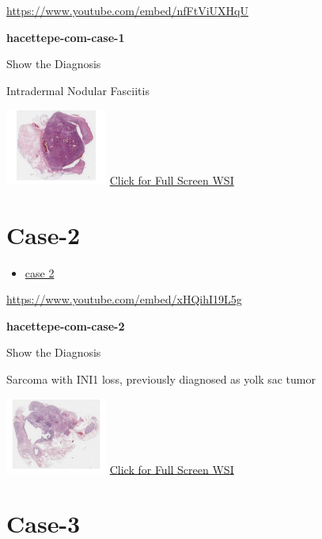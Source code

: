 \documentclass[
  letterpaper,
  paper=6in:9in,
  pagesize=pdftex,
  headinclude=on,
  footinclude=on,
  12pt]{scrbook}
\providecommand{\tightlist}{%
  \setlength{\itemsep}{0pt}\setlength{\parskip}{0pt}}\usepackage{longtable,booktabs,array}
\begin{document}
\url{https://www.youtube.com/embed/nfFtViUXHqU}

\textbf{hacettepe-com-case-1}

Show the Diagnosis

\hypertarget{answer}{}
Intradermal Nodular Fasciitis

\href{https://images.patolojiatlasi.com/hacettepe-com-case-1/HE.html}{\includegraphics[width=0.25\textwidth,height=\textheight]{./screenshots/hacettepe-com-case-1_screenshot.png}}
\href{https://images.patolojiatlasi.com/hacettepe-com-case-1/HE.html}{Click
for Full Screen WSI}

\hypertarget{sec-hacettepe-case-of-the-month-case-2}{%
\section{Case-2}\label{sec-hacettepe-case-of-the-month-case-2}}

\begin{itemize}
\tightlist
\item
  \href{https://www.youtube.com/watch?v=xHQihI19L5g\&ab_channel=KemalKosemehmetoglu}{case
  2}
\end{itemize}

\url{https://www.youtube.com/embed/xHQihI19L5g}

\textbf{hacettepe-com-case-2}

Show the Diagnosis

\hypertarget{answer2}{}
Sarcoma with INI1 loss, previously diagnosed as yolk sac tumor

\href{https://images.patolojiatlasi.com/hacettepe-com-case-2/HE.html}{\includegraphics[width=0.25\textwidth,height=\textheight]{./screenshots/hacettepe-com-case-2_screenshot.png}}
\href{https://images.patolojiatlasi.com/hacettepe-com-case-2/HE.html}{Click
for Full Screen WSI}

\hypertarget{sec-hacettepe-case-of-the-month-case-3}{%
\section{Case-3}\label{sec-hacettepe-case-of-the-month-case-3}}
\end{document}
